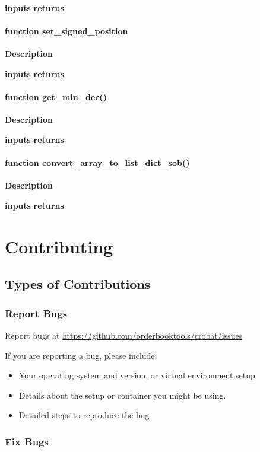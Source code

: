 \documentclass[refman]{article}
\begin{document}
\textbf{inputs}
\textbf{returns}

\paragraph{\textbf{function} set\_signed\_position}\hfill\break
\noindent \textbf{Description}

\textbf{inputs}
\textbf{returns}

\paragraph{\textbf{function} get\_min\_dec()}\hfill\break
\noindent \textbf{Description}

\textbf{inputs}
\textbf{returns}

\paragraph{\textbf{function} convert\_array\_to\_list\_dict\_sob()}\hfill\break
\noindent \textbf{Description}

\textbf{inputs}
\textbf{returns}

\newpage
\section{Contributing}
\subsection{Types of Contributions}
\subsubsection{Report Bugs}
Report bugs at \href{https://github.com/orderbooktools/crobat/issues}{https://github.com/orderbooktools/crobat/issues}
 
 If you are reporting a bug, please include:
 \begin{itemize}
 	\item Your operating system and version, or virtual environment setup
 	\item Details about the setup or container you might be using.
 	\item Detailed steps to reproduce the bug
 \end{itemize}
 
 \subsubsection{Fix Bugs}
 
\end{document}

